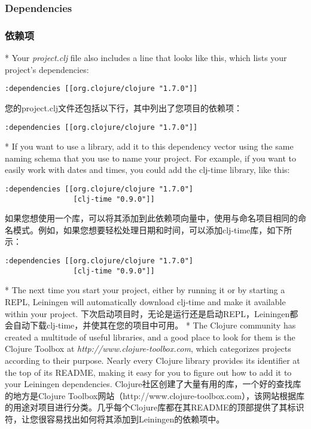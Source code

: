 \begin{paracol}{2}
\subsubsection{Dependencies}
\switchcolumn
\subsubsection{依赖项}
\switchcolumn[0]*
Your \emph{project.clj} file also includes a line that looks like this,
which lists your project's dependencies:
\begin{verbatim}
:dependencies [[org.clojure/clojure "1.7.0"]]
\end{verbatim}
\switchcolumn
您的project.clj文件还包括以下行，其中列出了您项目的依赖项：
\begin{verbatim}
:dependencies [[org.clojure/clojure "1.7.0"]]
\end{verbatim}
\switchcolumn[0]*
If you want to use a library, add it to this dependency vector using the
same naming schema that you use to name your project. For example, if
you want to easily work with dates and times, you could add the clj-time
library, like this:
\begin{verbatim}
:dependencies [[org.clojure/clojure "1.7.0"]
                [clj-time "0.9.0"]]
\end{verbatim}
\switchcolumn
如果您想使用一个库，可以将其添加到此依赖项向量中，使用与命名项目相同的命名模式。例如，如果您想要轻松处理日期和时间，可以添加clj-time库，如下所示：
\begin{verbatim}
:dependencies [[org.clojure/clojure "1.7.0"]
                [clj-time "0.9.0"]]
\end{verbatim}
\switchcolumn[0]*
The next time you start your project, either by running it or by
starting a REPL, Leiningen will automatically download clj-time and make
it available within your project.
\switchcolumn
下次启动项目时，无论是运行还是启动REPL，Leiningen都会自动下载clj-time，并使其在您的项目中可用。
\switchcolumn[0]*
The Clojure community has created a multitude of useful libraries, and a
good place to look for them is the Clojure Toolbox at
\emph{http://www.clojure-toolbox.com}, which categorizes projects
according to their purpose. Nearly every Clojure library provides its
identifier at the top of its README, making it easy for you to figure
out how to add it to your Leiningen dependencies.
\switchcolumn
Clojure社区创建了大量有用的库，一个好的查找库的地方是Clojure Toolbox网站（http://www.clojure-toolbox.com），该网站根据库的用途对项目进行分类。几乎每个Clojure库都在其README的顶部提供了其标识符，让您很容易找出如何将其添加到Leiningen的依赖项中。

\end{paracol}
